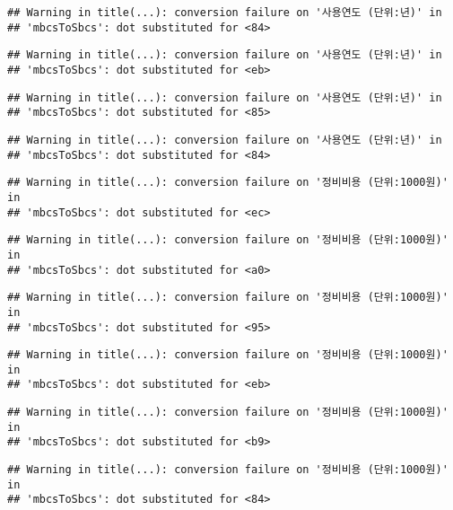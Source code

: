 \documentclass[
]{article}
\begin{document}
\begin{verbatim}
## Warning in title(...): conversion failure on '사용연도 (단위:년)' in
## 'mbcsToSbcs': dot substituted for <84>
\end{verbatim}

\begin{verbatim}
## Warning in title(...): conversion failure on '사용연도 (단위:년)' in
## 'mbcsToSbcs': dot substituted for <eb>
\end{verbatim}

\begin{verbatim}
## Warning in title(...): conversion failure on '사용연도 (단위:년)' in
## 'mbcsToSbcs': dot substituted for <85>
\end{verbatim}

\begin{verbatim}
## Warning in title(...): conversion failure on '사용연도 (단위:년)' in
## 'mbcsToSbcs': dot substituted for <84>
\end{verbatim}

\begin{verbatim}
## Warning in title(...): conversion failure on '정비비용 (단위:1000원)' in
## 'mbcsToSbcs': dot substituted for <ec>
\end{verbatim}

\begin{verbatim}
## Warning in title(...): conversion failure on '정비비용 (단위:1000원)' in
## 'mbcsToSbcs': dot substituted for <a0>
\end{verbatim}

\begin{verbatim}
## Warning in title(...): conversion failure on '정비비용 (단위:1000원)' in
## 'mbcsToSbcs': dot substituted for <95>
\end{verbatim}

\begin{verbatim}
## Warning in title(...): conversion failure on '정비비용 (단위:1000원)' in
## 'mbcsToSbcs': dot substituted for <eb>
\end{verbatim}

\begin{verbatim}
## Warning in title(...): conversion failure on '정비비용 (단위:1000원)' in
## 'mbcsToSbcs': dot substituted for <b9>
\end{verbatim}

\begin{verbatim}
## Warning in title(...): conversion failure on '정비비용 (단위:1000원)' in
## 'mbcsToSbcs': dot substituted for <84>
\end{verbatim}
\end{document}
